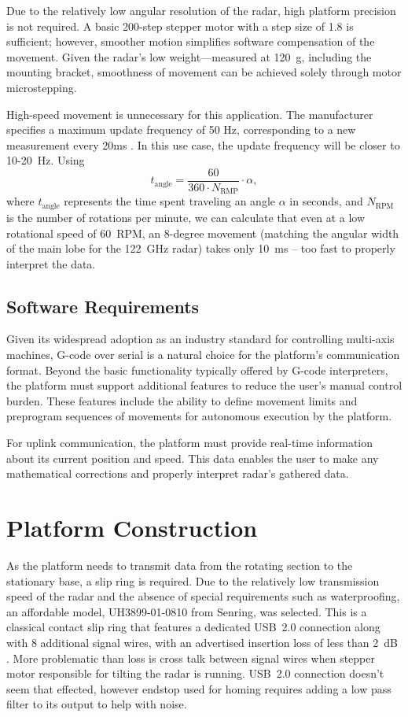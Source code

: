 Due to the relatively low angular resolution of the radar, high platform precision is not required.
A basic 200-step stepper motor with a step size of 1.8 is sufficient; however, smoother motion simplifies software compensation of the movement.
Given the radar’s low weight—measured at 120~g, including the mounting bracket, smoothness of movement can be achieved solely through motor microstepping.

High-speed movement is unnecessary for this application.
The manufacturer specifies a maximum update frequency of 50 Hz, corresponding to a new measurement every 20ms \cite{sidarMAN}.
In this use case, the update frequency will be closer to 10-20~Hz.
Using
%
\begin{equation}
  t_{\mathrm{angle}} = \frac{60}{360\cdot N_{\mathrm{RMP}}} \cdot  \alpha,
  \label{eq:poll}
\end{equation}
%
where $t_{\mathrm{angle}}$ represents the time spent traveling an angle $\alpha$ in seconds, and $N_{\mathrm{RPM}}$ is the number of rotations per minute, we can calculate that even at a low rotational speed of 60~RPM, an 8-degree movement (matching the angular width of the main lobe for the 122~GHz radar) takes only 10~ms -- too fast to properly interpret the data.


\subsection{Software Requirements}

Given its widespread adoption as an industry standard for controlling multi-axis machines, G-code over serial is a natural choice for the platform's communication format.
Beyond the basic functionality typically offered by G-code interpreters, the platform must support additional features to reduce the user's manual control burden.
These features include the ability to define movement limits and preprogram sequences of movements for autonomous execution by the platform.

For uplink communication, the platform must provide real-time information about its current position and speed.
This data enables the user to make any mathematical corrections and properly interpret radar's gathered data.


\section{Platform Construction}

As the platform needs to transmit data from the rotating section to the stationary base, a slip ring is required.
Due to the relatively low transmission speed of the radar and the absence of special requirements such as waterproofing, an affordable model, UH3899-01-0810 from Senring, was selected.
This is a classical contact slip ring that features a dedicated USB~2.0 connection along with 8 additional signal wires, with an advertised insertion loss of less than 2~dB \cite{slipring}.
More problematic than loss is cross talk between signal wires when stepper motor responsible for tilting the radar is running.
USB~2.0 connection doesn't seem that effected, however endstop used for homing requires adding a low pass filter to its output to help with noise.

